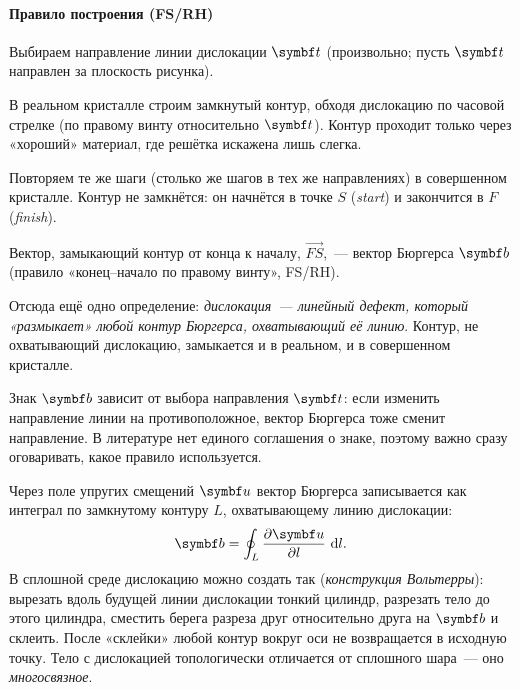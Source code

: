 \paragraph{Правило построения (FS/RH)}
\begin{shagi}
\item Выбираем направление линии дислокации $\vb t$ (произвольно; пусть
$\vb t$ направлен за плоскость рисунка).
\item В реальном кристалле строим замкнутый контур, обходя дислокацию по
часовой стрелке (по правому винту относительно $\vb t$). Контур проходит
только через «хороший» материал, где решётка искажена лишь слегка.
\item Повторяем те же шаги (столько же шагов в тех же направлениях) в
совершенном кристалле. Контур не замкнётся: он начнётся в точке $S$
(\emph{start}) и закончится в $F$ (\emph{finish}).
\item Вектор, замыкающий контур от конца к началу, $\overrightarrow{FS}$,~—
вектор Бюргерса $\vb b$ (правило «конец--начало по правому винту»,
FS/RH).
\end{shagi}

Отсюда ещё одно определение: \emph{дислокация~— линейный дефект, который
«размыкает» любой контур Бюргерса, охватывающий её линию}. Контур, не
охватывающий дислокацию, замыкается и в реальном, и в совершенном
кристалле.

\begin{vnimanie}
Знак $\vb b$ зависит от выбора направления $\vb t$: если изменить
направление линии на противоположное, вектор Бюргерса тоже сменит
направление. В литературе нет единого соглашения о знаке, поэтому важно
сразу оговаривать, какое правило используется.
\end{vnimanie}

\begin{podrobnee}
Через поле упругих смещений $\vb u$ вектор Бюргерса записывается как
интеграл по замкнутому контуру $L$, охватывающему линию дислокации:
\[
\vb b=\oint_L\frac{\partial\vb u}{\partial l}\,\d l .
\]
В сплошной среде дислокацию можно создать так (\emph{конструкция
Вольтерры}): вырезать вдоль будущей линии дислокации тонкий цилиндр,
разрезать тело до этого цилиндра, сместить берега разреза друг
относительно друга на $\vb b$ и склеить. После «склейки» любой контур
вокруг оси не возвращается в исходную точку. Тело с дислокацией
топологически отличается от сплошного шара~— оно \emph{многосвязное}.
\end{podrobnee}


